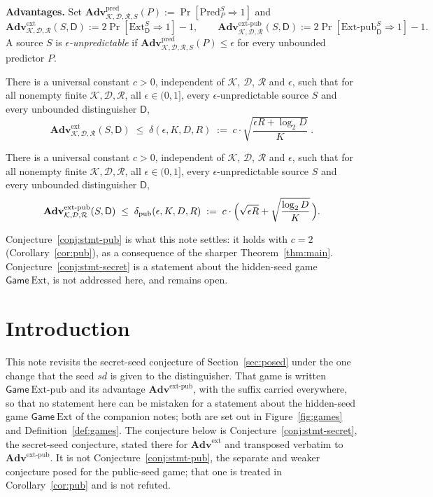 \documentclass{aicr-solution}
\newcommand{\Adv}{\mathbf{Adv}}
\newcommand{\Gm}{\mathsf{Game}}
\newcommand{\Pred}{\mathrm{Pred}}
\newcommand{\Ext}{\mathrm{Ext}}
\newcommand{\Extp}{\mathrm{Ext}\text{-}\mathrm{pub}}
\newcommand{\pred}{\mathrm{pred}}
\newcommand{\ext}{\mathrm{ext}}
\newcommand{\extp}{\mathrm{ext}\text{-}\mathrm{pub}}
\newcommand{\sd}{\mathit{sd}}
\newcommand{\calK}{\mathcal{K}}
\newcommand{\calD}{\mathcal{D}}
\newcommand{\calR}{\mathcal{R}}
\begin{document}
\medskip
\noindent\textbf{Advantages.}
Set $\Adv^{\pred}_{\calK,\calD,\calR,S}(P) := \Pr[\Pred^{S}_{P} \Rightarrow 1]$ and
\[
  \Adv^{\ext}_{\calK,\calD,\calR}(S,\mathsf{D}) := 2\Pr[\Ext^{S}_{\mathsf{D}} \Rightarrow 1] - 1 ,
  \qquad
  \Adv^{\extp}_{\calK,\calD,\calR}(S,\mathsf{D}) := 2\Pr[\Extp^{S}_{\mathsf{D}} \Rightarrow 1] - 1 .
\]
A source $S$ is \emph{$\epsilon$-unpredictable} if
$\Adv^{\pred}_{\calK,\calD,\calR,S}(P) \le \epsilon$ for every unbounded predictor $P$.

\begin{conjecture}\label{conj:stmt-secret}
There is a universal constant $c > 0$, independent of $\calK$, $\calD$, $\calR$ and $\epsilon$, such
that for all nonempty finite $\calK, \calD, \calR$, all $\epsilon \in (0,1]$, every
$\epsilon$-unpredictable source $S$ and every unbounded distinguisher $\mathsf{D}$,
\[
  \Adv^{\ext}_{\calK,\calD,\calR}(S,\mathsf{D})
  \;\le\; \delta(\epsilon, K, D, R)
  \;:=\; c \cdot \sqrt{\frac{\epsilon R + \log_2 D}{K}} \; .
\]
\end{conjecture}

\begin{conjecture}\label{conj:stmt-pub}
There is a universal constant $c > 0$, independent of $\calK$, $\calD$, $\calR$ and $\epsilon$, such
that for all nonempty finite $\calK, \calD, \calR$, all $\epsilon \in (0,1]$, every
$\epsilon$-unpredictable source $S$ and every unbounded distinguisher $\mathsf{D}$,
\[
  \Adv^{\extp}_{\calK,\calD,\calR}(S,\mathsf{D})
  \;\le\; \delta_{\mathrm{pub}}(\epsilon, K, D, R)
  \;:=\; c \cdot \Bigl( \sqrt{\epsilon R} + \sqrt{\frac{\log_2 D}{K}} \,\Bigr) .
\]
\end{conjecture}

\noindent
Conjecture~\ref{conj:stmt-pub} is what this note settles: it holds with $c = 2$
(Corollary~\ref{cor:pub}), as a consequence of the sharper Theorem~\ref{thm:main}.
Conjecture~\ref{conj:stmt-secret} is a statement about the hidden-seed game $\Gm\ \Ext$, is not
addressed here, and remains open.

\section{Introduction}\label{sec:intro}

This note revisits the secret-seed conjecture of Section~\ref{sec:posed} under the one change that
the seed $\sd$ is given to the distinguisher. That game is written $\Gm\ \Extp$ and its advantage
$\Adv^{\extp}$, with the suffix carried everywhere, so that no statement here can be mistaken for
a statement about the hidden-seed game $\Gm\ \Ext$ of the companion notes; both are set out in
Figure~\ref{fig:games} and Definition~\ref{def:games}. The conjecture below is
Conjecture~\ref{conj:stmt-secret}, the secret-seed conjecture, stated there for
$\Adv^{\ext}$ and transposed verbatim to $\Adv^{\extp}$. It is not
Conjecture~\ref{conj:stmt-pub}, the separate and weaker conjecture posed for the
public-seed game; that one is treated in Corollary~\ref{cor:pub} and is not refuted.
\end{document}
